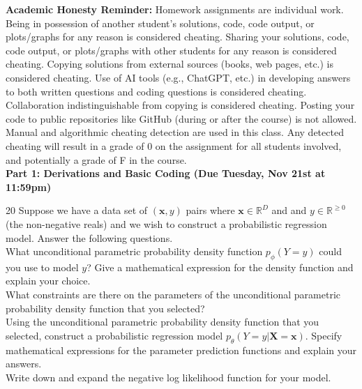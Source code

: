 \documentclass[11pt]{article}
\newcommand{\mbf}[1]{{\mathbf{#1}}}
\begin{document}
\textbf{Academic Honesty Reminder:} Homework assignments are individual work. Being in possession of another student's solutions, code, code output, or plots/graphs for any reason is considered cheating. Sharing your solutions, code, code output, or plots/graphs with other students for any reason is considered cheating. Copying solutions from external sources (books, web pages, etc.) is considered cheating. Use of AI tools (e.g., ChatGPT, etc.) in developing answers to both written questions and coding questions is considered cheating. Collaboration indistinguishable from copying is considered cheating. Posting your code to public repositories like GitHub (during or after the course) is not allowed. Manual and algorithmic cheating detection are used in this class. Any detected cheating will result in a grade of 0 on the assignment for all students involved, and potentially a grade of F in the course. 
\\

\textbf{Part 1: Derivations and Basic Coding (Due Tuesday, Nov 21st at 11:59pm)}

\begin{problem}{20} Suppose we have a data set of $(\mbf{x},y)$ pairs where $\mbf{x}\in\mathbb{R}^D$ and and $y\in\mathbb{R}^{\geq 0}$ (the non-negative reals) and we wish to construct a probabilistic regression model. Answer the following questions.\\

 What unconditional parametric probability density function $p_{\phi}(Y=y)$ could you use to model $y$? Give a mathematical expression for the density function and explain your choice.\\

 What constraints are there on the parameters of the unconditional parametric probability density function that you selected?\\

 Using the unconditional parametric probability density function that you selected, construct a probabilistic regression model  $p_{\theta}(Y=y|\mbf{X}=\mbf{x})$. Specify mathematical expressions for the parameter prediction functions and explain your answers.\\

 Write down and expand the negative log likelihood function for your model.

\end{problem}
\end{document}

